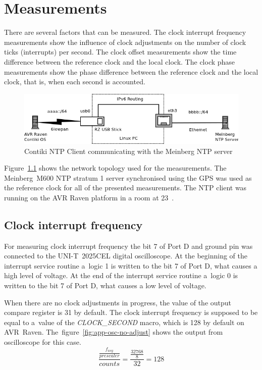
\chapter{Measurements}\label{chap:measurements}
There are several factors that can be measured.
The clock interrupt frequency measurements show the influence of clock adjustments
on the number of clock ticks (interrupts) per second.
The clock offset measurements show the time difference between the reference clock and
the local clock.
The clock phase measurements show the phase difference between the reference clock and
the local clock, that is, when each second is accounted.
\begin{figure}[H]
	\centering
	\includegraphics[width=13cm,keepaspectratio]{fig/radvd-routing.png}
	\caption{Contiki NTP Client communicating with the Meinberg NTP server}
	\label{fig:measurements-routing}
\end{figure}
Figure~\ref{fig:measurements-routing} shows the network topology used for the measurements.
The Meinberg~M600 NTP stratum 1 server synchronised using the GPS
was used as the reference clock for all of the presented measurements.
The NTP client was running on the AVR Raven platform in a room at 23~\textcelsius.

\section{Clock interrupt frequency}
For measuring clock interrupt frequency the bit 7 of Port D
and ground pin was connected to the UNI-T~2025CEL digital oscilloscope.
At the beginning of the interrupt service routine a~logic 1 is written
to the bit 7 of Port D, what causes a high level of voltage.
At the end of the interrupt service routine a~logic 0 is written
to the bit 7 of Port D, what causes a low level of voltage.

When there are no clock adjustments in progress, the value of the output compare register is 31 by default.
The clock interrupt frequency
is supposed to be equal to a~value of the {\it{CLOCK\_SECOND}} macro, which is 128 by default on AVR~Raven.
The~figure~\ref{fig:app-osc-no-adjust} shows the output from oscilloscope
for this case.
$$\frac{\frac{f_{asy}}{prescaler}}{counts} = \frac{\frac{32768}{8}}{32} = 128$$

